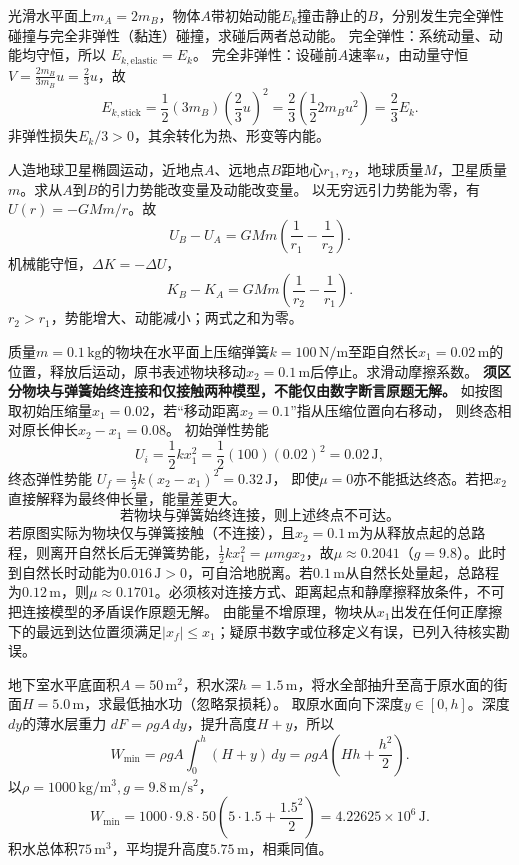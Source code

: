 \problemtext 光滑水平面上$m_A=2m_B$，物体$A$带初始动能$E_k$撞击静止的$B$，分别发生完全弹性碰撞与完全非弹性（黏连）碰撞，求碰后两者总动能。
\workings
完全弹性：系统动量、动能均守恒，所以
$\boxed{E_{k,\mathrm{elastic}}=E_k}$。
完全非弹性：设碰前$A$速率$u$，由动量守恒
$V=\frac{2m_B}{3m_B}u=\frac23u$，故
\[
E_{k,\mathrm{stick}}=\frac12(3m_B)\left(\frac23u\right)^2
=\frac23\left(\frac12 2m_Bu^2\right)
=\boxed{\frac23E_k}.
\]
\crosscheck 非弹性损失$E_k/3>0$，其余转化为热、形变等内能。

\problemtext 人造地球卫星椭圆运动，近地点$A$、远地点$B$距地心$r_1,r_2$，地球质量$M$，卫星质量$m$。求从$A$到$B$的引力势能改变量及动能改变量。
\workings
以无穷远引力势能为零，有$U(r)=-GMm/r$。故
\[
\boxed{U_B-U_A=GMm\left(\frac1{r_1}-\frac1{r_2}\right)}.
\]
机械能守恒，$\Delta K=-\Delta U$，
\[
\boxed{K_B-K_A=GMm\left(\frac1{r_2}-\frac1{r_1}\right)}.
\]
\crosscheck $r_2>r_1$，势能增大、动能减小；两式之和为零。

\problemtext 质量$m=0.1\,\mathrm{kg}$的物块在水平面上压缩弹簧$k=100\,\mathrm{N/m}$至距自然长$x_1=0.02\,\mathrm m$的位置，释放后运动，原书表述物块移动$x_2=0.1\,\mathrm m$后停止。求滑动摩擦系数。
\workings
\textbf{须区分物块与弹簧始终连接和仅接触两种模型，不能仅由数字断言原题无解。}
如按图取初始压缩量$x_1=0.02$，若“移动距离$x_2=0.1$”指从压缩位置向右移动，
则终态相对原长伸长$x_2-x_1=0.08$。
初始弹性势能
\[
U_i=\frac12kx_1^2=\frac12(100)(0.02)^2=0.02\,\mathrm J,
\]
终态弹性势能
$U_f=\frac12k(x_2-x_1)^2=0.32\,\mathrm J$，
即使$\mu=0$亦不能抵达终态。若把$x_2$直接解释为最终伸长量，能量差更大。
\[
\boxed{\text{若物块与弹簧始终连接，则上述终点不可达。}}
\]
若原图实际为物块仅与弹簧接触（不连接），且$x_2=0.1\,\mathrm m$为从释放点起的总路程，则离开自然长后无弹簧势能，$\frac12kx_1^2=\mu mgx_2$，故$\boxed{\mu\approx0.2041}$（$g=9.8$）。此时到自然长时动能为$0.016\,\mathrm J>0$，可自洽地脱离。若$0.1\,\mathrm m$从自然长处量起，总路程为$0.12\,\mathrm m$，则$\mu\approx0.1701$。必须核对连接方式、距离起点和静摩擦释放条件，不可把连接模型的矛盾误作原题无解。
\crosscheck 由能量不增原理，物块从$x_1$出发在任何正摩擦下的最远到达位置须满足$|x_f|\le x_1$；疑原书数字或位移定义有误，已列入待核实勘误。

\problemtext 地下室水平底面积$A=50\,\mathrm{m^2}$，积水深$h=1.5\,\mathrm m$，将水全部抽升至高于原水面的街面$H=5.0\,\mathrm m$，求最低抽水功（忽略泵损耗）。
\workings
取原水面向下深度$y\in[0,h]$。深度$dy$的薄水层重力
$dF=\rho gA\,dy$，提升高度$H+y$，所以
\[
W_{\min}=\rho gA\int_0^h(H+y)\,dy
=\rho gA\left(Hh+\frac{h^2}{2}\right).
\]
以$\rho=1000\,\mathrm{kg/m^3},g=9.8\,\mathrm{m/s^2}$，
\[
\boxed{W_{\min}
=1000\cdot9.8\cdot50\left(5\cdot1.5+\frac{1.5^2}{2}\right)
=4.22625\times10^6\,\mathrm J}.
\]
\crosscheck 积水总体积$75\,\mathrm{m^3}$，平均提升高度$5.75\,\mathrm m$，相乘同值。

